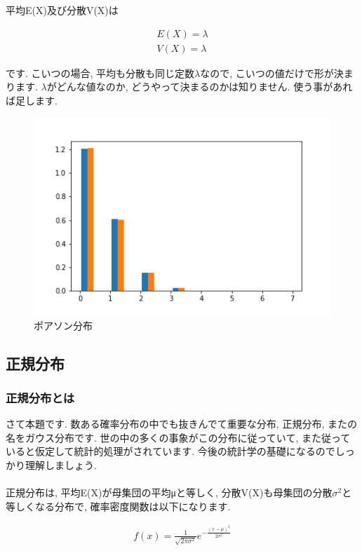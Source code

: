 \documentclass[11pt,a4paper]{jreport}
\begin{document}
平均E(X)及び分散V(X)は

\begin{eqnarray}
E(X) = \lambda\\
V(X) = \lambda
\end{eqnarray}

です. こいつの場合, 平均も分散も同じ定数$\lambda$なので, こいつの値だけで形が決まります. $\lambda$がどんな値なのか, どうやって決まるのかは知りません. 使う事があれば足します.\\

\begin{figure}[H]
\label{im:poisson}
  \centering
  \includegraphics[width=120mm,bb=0 0 432 288]{figures/poisson.png}
  \caption{ポアソン分布}
\end{figure}

\subsection{正規分布}
\subsubsection{正規分布とは}
さて本題です. 数ある確率分布の中でも抜きんでて重要な分布, 正規分布, またの名をガウス分布です. 世の中の多くの事象がこの分布に従っていて, また従っていると仮定して統計的処理がされています. 今後の統計学の基礎になるのでしっかり理解しましょう.\\
\\
正規分布は, 平均E(X)が母集団の平均μと等しく, 分散V(X)も母集団の分散$\sigma ^2$と等しくなる分布で, 確率密度関数は以下になります.

\begin{eqnarray}
\label{eq:normal}
f(x) = \frac{1}{\sqrt{2\pi\sigma^2}}e^{-\frac{(x-\mu)^2}{2\sigma^2}}
\end{eqnarray}
\end{document}
